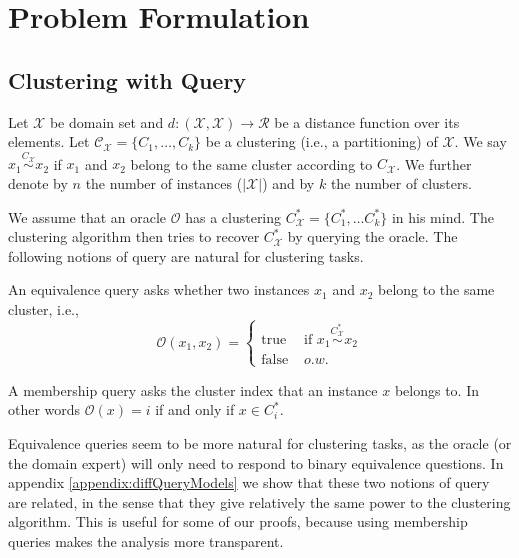 \documentclass[orivec]{llncs}
\newcommand{\mc}{\mathcal}
\begin{document}
\section{Problem Formulation}



\subsection{Clustering with Query}

Let $\mc X$ be domain set and $d:(\mc X, \mc X) \rightarrow \mc R $ be a distance function over its elements. Let $\mc C_{\mc X} = \{C_1, \ldots, C_k\}$ be a clustering (i.e., a partitioning) of $\mc X$. We say $x_1 \overset{C_{\mc X}}{\sim} x_2$ if $x_1$ and $x_2$ belong to the same cluster according to $C_{\mc X}$. We further denote by $n$ the number of instances ($|{\mc X}|$) and by $k$ the number of clusters.

We assume that an oracle $\mc O$ has a clustering $C^*_{\mc X}=\{ C^*_1, \ldots C^*_k\}$ in his mind. The clustering algorithm then tries to recover $C^*_{\mc X}$ by querying the oracle. The following notions of query are natural for clustering tasks.

\begin{definition}
An equivalence query asks whether two instances $x_1$ and $x_2$ belong to the same cluster, i.e., 
$${\mc O}(x_1, x_2) = \left\{
	\begin{array}{ll}
		\mbox{true }  & \mbox{if } x_1 \overset{C^*_{\mc X}}{\sim} x_2   \\
		\mbox{false } & o.w. 
	\end{array}
\right. $$
\end{definition}

\begin{definition}
A membership query asks the cluster index that an instance $x$ belongs to. In other words ${\mc O}(x) = i$ if and only if $x \in C^*_i$.
\end{definition}

Equivalence queries seem to be more natural for clustering tasks, as the oracle (or the domain expert) will only need to respond to binary equivalence questions. In appendix \ref{appendix:diffQueryModels} we show that these two notions of query are related, in the sense that they give relatively the same power to the clustering algorithm. This is useful for some of our proofs, because using membership queries makes the analysis more transparent.
\end{document}
